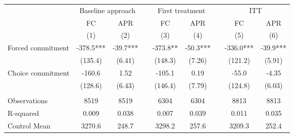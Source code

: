 \begin{tabular}{lcccccccc}
\toprule
      & \multicolumn{2}{c}{Baseline approach} &       & \multicolumn{2}{c}{First treatment} &       & \multicolumn{2}{c}{ITT} \\
\cmidrule{2-3}\cmidrule{5-6}\cmidrule{8-9}      & FC    & APR   &       & FC    & APR   &       & FC    & APR \\
\midrule
      & (1)   & (2)   &       & (3)   & (4)   &       & (5)   & (6) \\
\midrule
\midrule
Forced commitment & -378.5*** & -39.7*** &       & -373.8** & -50.3*** &       & -336.0*** & -39.9*** \\
      & (135.4) & (6.41) &       & (148.3) & (7.26) &       & (121.2) & (5.91) \\
Choice commitment & -160.6 & 1.52  &       & -105.1 & 0.19  &       & -55.0 & -4.35 \\
      & (128.6) & (6.43) &       & (146.4) & (7.79) &       & (124.8) & (6.03) \\
      &       &       &       &       &       &       &       &  \\
\midrule
Observations & 8519  & 8519  &       & 6304  & 6304  &       & 8813  & 8813 \\
R-squared & 0.009 & 0.038 &       & 0.007 & 0.039 &       & 0.011 & 0.035 \\
Control Mean & 3270.6 & 248.7 &       & 3298.2 & 257.6 &       & 3209.3 & 252.4 \\
\bottomrule
\bottomrule
\end{tabular}%
